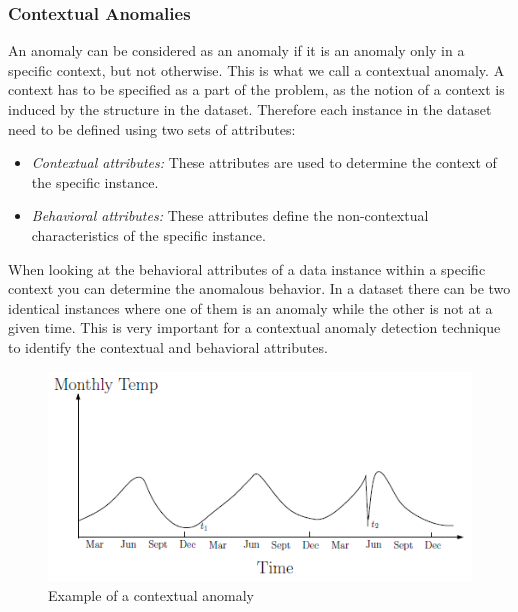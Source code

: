 \documentclass[english, a4paper]{report}
\begin{document}
{{{            \subsubsection{Contextual Anomalies} \label{contextualAnomaly}
            {
                An anomaly can be considered as an anomaly if it is an anomaly only in a specific context, but not otherwise. This is what we call a contextual anomaly. A context has to be specified as a part of the problem, as the notion of a context is induced by the structure in the dataset. Therefore each instance in the dataset need to be defined using two sets of attributes:
                
                \begin{itemize}
                    \item \textit{Contextual attributes:} These attributes are used to determine the context of the specific instance. 
                    \item \textit{Behavioral attributes:} These attributes define the non-contextual characteristics of the specific instance. 
                \end{itemize}
                
                When looking at the behavioral attributes of a data instance within a specific context you can determine the anomalous behavior. In a dataset there can be two identical instances where one of them is an anomaly while the other is not at a given time. This is very important for a contextual anomaly detection technique to identify the contextual and behavioral attributes. 
                \par
                
                \begin{figure}[H]
                    \centering
                    \includegraphics{contextualAnomaly}
                    \caption{Example of a contextual anomaly \cite{anomalyDetection}}
                    \label{fig:contextualAnomaly}
                \end{figure} 
                
}}}}
\end{document}
